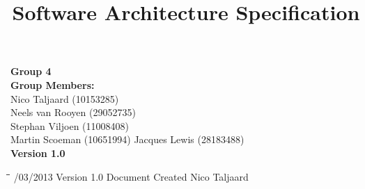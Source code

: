 \documentclass[12pt]{article}
\title{Software Architecture Specification}
\begin{document}

\maketitle

\vspace{4em}

\begin{center}%

  \LARGE {\bf Group 4}\\[2em]
  \LARGE {\bf Group Members:}\\[1em]
  \large
      Nico Taljaard			(10153285)	\\
      Neels van Rooyen		(29052735)	\\
	  Stephan Viljoen       (11008408)  \\
	  Martin Scoeman		(10651994)	
	  Jacques Lewis		(28183488)\\[6em]
      
      {\bf Version 1.0}
    
\end{center}%

\newpage


\begin{tabbing}
\hspace*{3cm}\=\hspace*{3cm}\=\hspace*{8cm}\=\hspace*{3cm} /03/2013 \> Version 1.0 \> Document Created \> Nico Taljaard\\

\end{tabbing}

\newpage


\tableofcontents

\newpage

\end{document}
